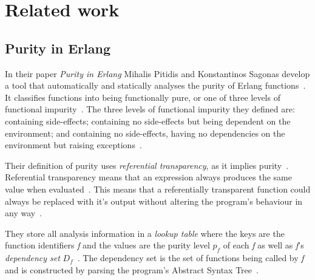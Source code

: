 \documentclass[a4paper,12pt]{article}
\begin{document}


\section{Related work} \label{sec:Related work} %

\subsection{Purity in Erlang} \label{sub:Purity-in-Erlang}
In their paper \textit{Purity in Erlang} Mihalis Pitidis and Konstantinos Sagonas develop a tool that automatically and statically analyses the purity of Erlang functions~\cite{pitidis2010purity}. It classifies functions into being functionally pure, or one of three levels of functional impurity~\cite{pitidis2010purity}.
The three levels of functional impurity they defined are: containing side-effects; containing no side-effects but being dependent on the environment; and containing no side-effects, having no dependencies on the environment but raising exceptions~\cite{pitidis2010purity}.

Their definition of purity uses \textit{referential transparency}, as it implies purity~\cite{pitidis2010purity}. Referential transparency means that an expression always produces the same value when evaluated~\cite{pitidis2010purity}. This means that a referentially transparent function could always be replaced with it's output without altering the program's behaviour in any way~\cite{pitidis2010purity}.

They store all analysis information in a \textit{lookup table} where the keys are the function identifiers \textit{f} and the values are the purity level \textit{$p_f$} of each \textit{f} as well as \textit{f}'s \textit{dependency set} $D_f$~\cite{pitidis2010purity}. The dependency set is the set of functions being called by \textit{f} and is constructed by parsing the program's Abstract Syntax Tree~\cite{pitidis2010purity}.
\end{document}
